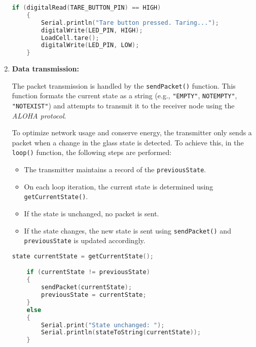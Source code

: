 \begin{enumerate}
{    \begin{lstlisting}[language=C++, caption={Tare function}]
    if (digitalRead(TARE_BUTTON_PIN) == HIGH)
    {
        Serial.println("Tare button pressed. Taring...");
        digitalWrite(LED_PIN, HIGH);
        LoadCell.tare();
        digitalWrite(LED_PIN, LOW);
    }
    \end{lstlisting}}

    \item \textbf{Data transmission:}{
    The packet transmission is handled by the \texttt{sendPacket()} function. 
    This function formats the current state as a string (e.g., \texttt{"EMPTY"}, \texttt{NOTEMPTY"}, \texttt{"NOTEXIST"}) and attempts to transmit it to the receiver node using the \textit{ALOHA protocol}.

    To optimize network usage and conserve energy, the transmitter only sends a packet when a change in the glass state is detected.
    To achieve this, in the \texttt{loop()} function, the following steps are performed:
    \begin{itemize}
        \item The transmitter maintains a record of the \texttt{previousState}.
        \item On each loop iteration, the current state is determined using \texttt{getCurrentState()}.
        \item If the state is unchanged, no packet is sent.
        \item If the state changes, the new state is sent using \texttt{sendPacket()} and \texttt{previousState} is updated accordingly.
    \end{itemize}

    \begin{lstlisting}[language=C++, caption={Packet transmission on state change}]
    state currentState = getCurrentState();

    if (currentState != previousState)
    {
        sendPacket(currentState);
        previousState = currentState;
    }
    else
    {
        Serial.print("State unchanged: ");
        Serial.println(stateToString(currentState));
    }
    \end{lstlisting}}
\end{enumerate}
